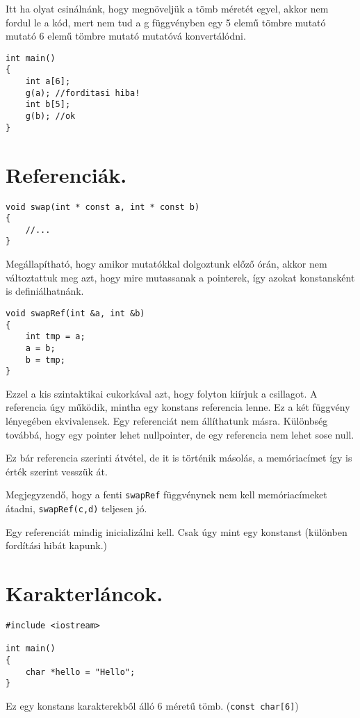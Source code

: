 \documentclass[a4paper,11.5pt]{article}
\begin{document}
	Itt ha olyat csinálnánk, hogy megnöveljük a tömb méretét egyel, akkor nem fordul le a kód, mert nem tud a g függvényben egy 5 elemű tömbre mutató mutató 6 elemű tömbre mutató mutatóvá konvertálódni.
	\begin{lstlisting}
int main()
{
	int a[6];
	g(a); //forditasi hiba!
	int b[5];
	g(b); //ok
}
	\end{lstlisting}
	\section{Referenciák.}
	\begin{lstlisting}
void swap(int * const a, int * const b)
{
	//...
}
	\end{lstlisting}
	Megállapítható, hogy amikor mutatókkal dolgoztunk előző órán, akkor nem változtattuk meg azt, hogy mire mutassanak a pointerek, így azokat konstansként is definiálhatnánk.
	\begin{lstlisting}
void swapRef(int &a, int &b)
{
	int tmp = a;
	a = b;
	b = tmp;
}
	\end{lstlisting}
	Ezzel a kis szintaktikai cukorkával azt, hogy folyton kiírjuk a csillagot. A referencia úgy működik, mintha egy konstans referencia lenne. Ez a két függvény lényegében ekvivalensek. Egy referenciát nem állíthatunk másra. Különbség továbbá, hogy egy pointer lehet nullpointer, de egy referencia nem lehet sose null.
	\begin{note}
		Ez bár referencia szerinti átvétel, de it is történik másolás, a memóriacímet így is érték szerint vesszük át.
	\end{note}
	Megjegyzendő, hogy a fenti \texttt{swapRef} függvénynek nem kell memóriacímeket átadni, \texttt{swapRef(c,d)} teljesen jó.
	\begin{note}
		Egy referenciát mindig inicializálni kell. Csak úgy mint egy konstanst (különben fordítási hibát kapunk.)
	\end{note}
	\section{Karakterláncok.}
	\begin{lstlisting}
#include <iostream>

int main()
{
	char *hello = "Hello";
}
	\end{lstlisting}
	Ez egy konstans karakterekből álló 6 méretű tömb. (\texttt{const char[6]})
	
\end{document}
